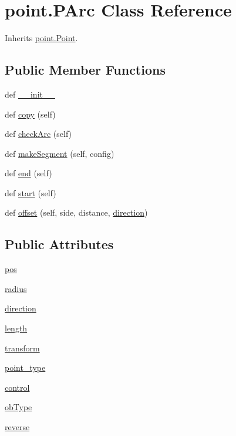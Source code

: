 \hypertarget{classpoint_1_1_p_arc}{}\section{point.\+P\+Arc Class Reference}
\label{classpoint_1_1_p_arc}


Inherits \hyperlink{classpoint_1_1_point}{point.\+Point}.

\subsection*{Public Member Functions}
\begin{DoxyCompactItemize}
\item 
def \hyperlink{classpoint_1_1_p_arc_ae0cd85a19d18f2d91b90da5d945d237b}{\+\_\+\+\_\+init\+\_\+\+\_\+}
\item 
def \hyperlink{classpoint_1_1_p_arc_ad2fc001c2ef68b8cacc5e85599ad98ef}{copy} (self)
\item 
def \hyperlink{classpoint_1_1_p_arc_ac40eec0f8a2a6883dc54a10277712967}{check\+Arc} (self)
\item 
def \hyperlink{classpoint_1_1_p_arc_a91f29f626af24534b1f1fd7e87a6c461}{make\+Segment} (self, config)
\item 
def \hyperlink{classpoint_1_1_p_arc_a7f3d20cce8a284d130c03fd5e8e11b2f}{end} (self)
\item 
def \hyperlink{classpoint_1_1_p_arc_aeacf917d9e8dc6de2482703f2196396d}{start} (self)
\item 
def \hyperlink{classpoint_1_1_p_arc_ada11779d2818520888b74ad48a7f8755}{offset} (self, side, distance, \hyperlink{classpoint_1_1_p_arc_af38c8778c3b2863f9b6354ac483c3969}{direction})
\end{DoxyCompactItemize}
\subsection*{Public Attributes}
\begin{DoxyCompactItemize}
\item 
\hyperlink{classpoint_1_1_p_arc_a63d062c53f0c2232c0ff29fbc490b820}{pos}
\item 
\hyperlink{classpoint_1_1_p_arc_a8b8a7011a622c35fdaef3e1a684281f5}{radius}
\item 
\hyperlink{classpoint_1_1_p_arc_af38c8778c3b2863f9b6354ac483c3969}{direction}
\item 
\hyperlink{classpoint_1_1_p_arc_a2f61a9a998f24a3146c2054d93b1f3ab}{length}
\item 
\hyperlink{classpoint_1_1_p_arc_a1e706569aa26185265004dd619ffe0ef}{transform}
\item 
\hyperlink{classpoint_1_1_p_arc_ab8c6246d191ebc6d342a6e339d91759e}{point\+\_\+type}
\item 
\hyperlink{classpoint_1_1_p_arc_a7262e7618275455c4be25eec31c8badc}{control}
\item 
\hyperlink{classpoint_1_1_p_arc_a7fac00f664540af214f6f8d8f3f7a456}{ob\+Type}
\item 
\hyperlink{classpoint_1_1_p_arc_a052f5ccae99936b8d39120d398a9c7ff}{reverse}
\end{DoxyCompactItemize}


